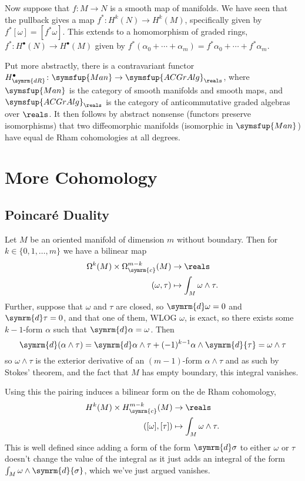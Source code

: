 \documentclass[fleqn]{NotesClass}
\makeatletter
\renewcommand{\dl}{\symrm{d}}
\newcommand{\c@egory}{\symsfup}
\newcommand{\Man}{\c@egory{Man}}
\newcommand{\ACGrAlg}[1][\field]{\c@egory{ACGrAlg}_{#1}}
\newcommand{\compact}{\symrm{c}}
\makeatother
\begin{document}
    Now suppose that \(f \colon M \to N\) is a smooth map of manifolds.
    We have seen that the pullback gives a map \(f^* \colon H^k(N) \to H^k(M)\), specifically given by \(f^*[\omega] = [f^*\omega]\).
    This extends to a homomorphism of graded rings, \(f^* \colon H^{\bullet}(N) \to H^{\bullet}(M)\) given by \(f^*(\alpha_0 + \dotsb + \alpha_m) = f^*\alpha_0 + \dotsb + f^*\alpha_m\).
    
    Put more abstractly, there is a contravariant functor \(H_{\symrm{dR}}^{\bullet} \colon \Man \to \ACGrAlg[\reals]\), where \(\Man\) is the category of smooth manifolds and smooth maps, and \(\ACGrAlg[\reals]\) is the category of anticommutative graded algebras over \(\reals\).
    It then follows by abstract nonsense (functors preserve isomorphisms) that two diffeomorphic manifolds (isomorphic in \(\Man\)) have equal de Rham cohomologies at all degrees.
    
    \chapter{More Cohomology}
    \section{Poincar\'e Duality}
    Let \(M\) be an oriented manifold of dimension \(m\) without boundary.
    Then for \(k \in \{0, 1, \dotsc, m\}\) we have a bilinear map
    \begin{align}
        \Omega^k(M) \times \Omega_{\compact}^{m-k}(M) &\to \reals\\
        (\omega, \tau) &\mapsto \int_M \omega \wedge \tau.
    \end{align}
    Further, suppose that \(\omega\) and \(\tau\) are closed, so \(\dl\omega = 0\) and \(\dl \tau = 0\), and that one of them, WLOG \(\omega\), is exact, so there exists some \(k-1\)-form \(\alpha\) such that \(\dl \alpha = \omega\).
    Then
    \begin{equation}
        \dl(\alpha \wedge \tau) = \dl \alpha \wedge \tau + (-1)^{k-1} \alpha \wedge \dl{\tau} = \omega \wedge \tau
    \end{equation}
    so \(\omega \wedge \tau\) is the exterior derivative of an \((m - 1)\)-form \(\alpha \wedge \tau\) and as such by Stokes' theorem, and the fact that \(M\) has empty boundary, this integral vanishes.
    
    Using this the pairing induces a bilinear form on the de Rham cohomology,
    \begin{align}
        H^k(M) \times H^{m-k}_{\compact}(M) &\to \reals\\
        ([\omega], [\tau]) &\mapsto \int_M \omega \wedge \tau. \label{eqn:poincare pairing}
    \end{align}
    This is well defined since adding a form of the form \(\dl \sigma\) to either \(\omega\) or \(\tau\) doesn't change the value of the integral as it just adds an integral of the form \(\int_M \omega \wedge \dl{\sigma}\), which we've just argued vanishes.
    
\end{document}
